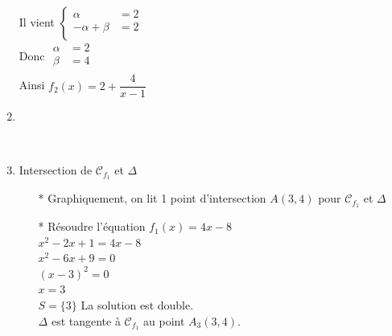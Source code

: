 \begin{enumerate}
Il vient \raisebox{-2ex}
          {$\left\lbrace
             \begin{array}{rl}
                    \alpha \!\!\!\!\!\!\!\!& = 2   \\
            -\alpha +\beta \!\!\!\!\!\!\!\!& = 2 \\        
            \end{array}
            \right.$}\\    
            

Donc \raisebox{-2ex}
          {$\begin{array}{rl}
                    \alpha \!\!\!\!\!\!\!\!& =  2 \\
                    \beta  \!\!\!\!\!\!\!\!& =  4 \\        
             \end{array}$}\\             
            
Ainsi $ f_2(x) = 2 + \dfrac{4}{x - 1}$ \\

                              
            
\item ~\\
\centerline{}\\

\newpage

\item Intersection de $\mathcal{C}_{f_1}$ et $\Delta$ \\

\begin{itemize}
\item [*] Graphiquement, on lit 1 point d'intersection  $A(3, 4)$  pour $\mathcal{C}_{f_1}$ et $\Delta$\\ 

\item [*] Résoudre l'équation $f_1(x) = 4x - 8$\\

$  x^2 -2x + 1 = 4x -8 $\\
$  x^2 -6x +9 = 0 $\\
$  (x - 3)^2 = 0 $ \\
$ x = 3 $ \\

$S=\{3\}$ La solution est double. \\
               
$\Delta$ est tangente à   $\mathcal{C}_{f_1}$ au point $A_3(3,4)$.
             

\end{itemize}
\end{enumerate}
